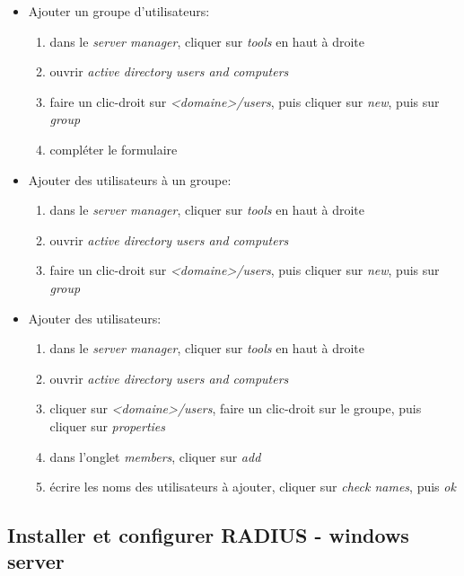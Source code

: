 \documentclass[a4paper]{article}
\begin{document}
\begin{itemize}
    \item Ajouter un groupe d'utilisateurs:
    \begin{enumerate}
        \item dans le \textit{server manager}, cliquer sur \textit{tools} en haut à droite
        \item ouvrir \textit{active directory users and computers}
        \item faire un clic-droit sur \textit{<domaine>/users}, puis cliquer sur \textit{new}, puis sur \textit{group}
        \item compléter le formulaire 
    \end{enumerate}
    \item Ajouter des utilisateurs à un groupe:
    \begin{enumerate}
        \item dans le \textit{server manager}, cliquer sur \textit{tools} en haut à droite
        \item ouvrir \textit{active directory users and computers}
        \item faire un clic-droit sur \textit{<domaine>/users}, puis cliquer sur \textit{new}, puis sur \textit{group}
    \end{enumerate}
    \item Ajouter des utilisateurs:
    \begin{enumerate}
        \item dans le \textit{server manager}, cliquer sur \textit{tools} en haut à droite
        \item ouvrir \textit{active directory users and computers}
        \item cliquer sur \textit{<domaine>/users}, faire un clic-droit sur le groupe, puis cliquer sur \textit{properties}
        \item dans l'onglet \textit{members}, cliquer sur \textit{add}
        \item écrire les noms des utilisateurs à ajouter, cliquer sur \textit{check names}, puis \textit{ok}
    \end{enumerate}
\end{itemize}










\subsection{Installer et configurer RADIUS - windows server}
\end{document}
